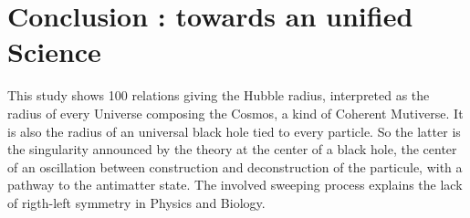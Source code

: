 \documentclass[a4paper,9pt]{article}
\begin{document}






    





\section{Conclusion : towards an unified Science}

This study shows 100 relations giving the Hubble radius, interpreted as the radius of every Universe composing the Cosmos, a kind of Coherent Mutiverse. It is also the radius of an universal black hole tied to every particle. So the latter is the singularity announced by the theory at the center of a black hole, the center of an oscillation between construction and deconstruction of the particule, with a pathway to the antimatter state. The involved sweeping process explains the lack of rigth-left symmetry  in Physics and Biology.
\end{document}
